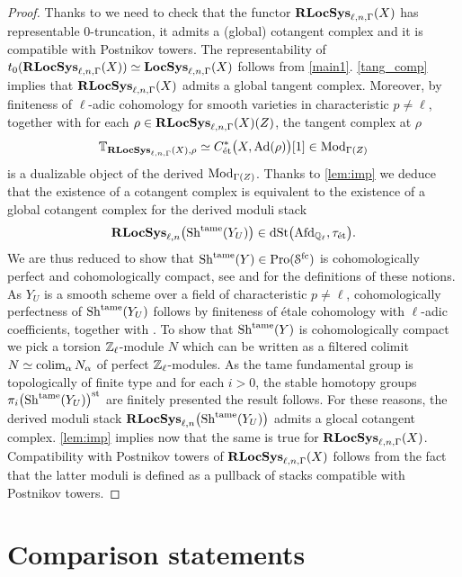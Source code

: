 \documentclass[10pt,a4paper]{amsart}
\numberwithin{equation}{subsection}
\theoremstyle{plain}
\theoremstyle{definition}
\theoremstyle{remark}
\numberwithin{equation}{section}
\begin{document}
\begin{proof}
Thanks to \cite[Theorem 7.1]{porta_rep} we need to check that the functor $\mathbf R \mathbf{LocSys}_{\ell, n, \Gamma}(X)$ has representable $0$-truncation, it admits a (global) cotangent complex and it is compatible with Postnikov towers. The representability of $t_0(\mathbf R \mathbf{LocSys}_{\ell, n, \Gamma}(X) ) \simeq
\mathbf{LocSys}_{\ell, n, \Gamma}(X)$ follows from \cref{main1}. \cref{tang_comp} implies that $\mathbf R \mathbf{LocSys}_{\ell, n, \Gamma}(X)$ admits a global tangent complex. Moreover, by finiteness of $\ell$-adic cohomology for smooth varieties in characteristic $p \neq \ell$, \cite[Theorem 19.1]{milne_et} together
with \cite[Proposition 3.1.7]{me1} for each $\rho \in \mathbf R \mathbf{LocSys}_{\ell, n, \Gamma}(X)(Z)$, the tangent complex at $\rho$
	\[
		\mathbb T_{\mathbf R \mathbf{LocSys}_{\ell, n, \Gamma}(X), \rho} \simeq C^*_{\text{\'et}} \big( X, \mathrm{Ad} (\rho) \big) [1] \in \mathrm{Mod}_{\Gamma(Z)}
	\]
is a dualizable object of the derived \infcat $\mathrm{Mod}_{\Gamma(Z)}$. Thanks to \cref{lem:imp} we deduce that the existence of a cotangent complex is equivalent to the existence of a global cotangent complex for the derived moduli stack
	\[
		\mathbf R \mathbf{LocSys}_{\ell, n} \big( \mathrm{Sh}^{\mathrm{tame}}(Y_U) \big) \in \mathrm{dSt} \big( \mathrm{Afd}_{\mathbb{Q}_\ell}, \tau_{\text{\'et}} \big).
	\]
We are thus reduced to show that $\mathrm{Sh}^{\mathrm{tame}} (Y) \in \mathrm{Pro} ( \mathcal S^{\mathrm{fc}})$ is cohomologically perfect and cohomologically compact, see \cite[Definition 4.2.7]{me1} and \cite[Definition 4.3.17]{me1} for the definitions of these notions. As $Y_U$
is a smooth scheme over a field of characteristic $p \neq \ell$, cohomologically perfectness of $\mathrm{Sh}^{\mathrm{tame}}(Y_U)$ follows by finiteness of \'etale cohomology with $\ell$-adic coefficients, \cite[Theorem 19.1]{milne_et} together with \cite[Proposition 3.1.7]{me1}.
To show that $\mathrm{Sh}^{\mathrm{tame}}(Y)$ is cohomologically compact we pick a torsion $\mathbb Z_\ell$-module $N$ which can be written as a filtered colimit $N \simeq \operatorname*{colim}_{\alpha} N_{\alpha}$ of perfect $\mathbb Z_\ell$-modules. As the tame fundamental group is topologically
of finite type and for each $i > 0 $, the stable homotopy groups $\pi_i \big( \mathrm{Sh}^{\mathrm{tame}}(Y_U) \big)^{\mathrm{st}}$ are finitely presented the result follows.
For these reasons, the derived moduli stack $\mathbf R \mathbf{LocSys}_{\ell, n} \big( \mathrm{Sh}^{\mathrm{tame}}(Y_U) \big)$ admits a glocal cotangent complex. \cref{lem:imp} implies now that the same is true for $\mathbf R \mathbf{LocSys}_{\ell, n, \Gamma}(X)$. Compatibility with Postnikov towers of $\mathbf R \mathbf{LocSys}_{\ell, n, \Gamma}(X)$ follows from the
fact that the latter moduli is defined as a pullback of stacks compatible with Postnikov towers.
\end{proof}


\section{Comparison statements}
\end{document}
